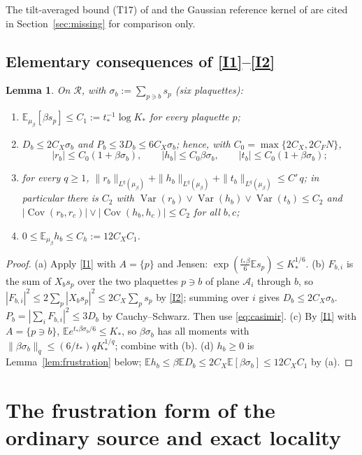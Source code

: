 \documentclass[11pt]{article}
\newtheorem{lemma}[theorem]{Lemma}
\theoremstyle{definition}
\newcommand{\E}{\mathbb{E}}
\newcommand{\Var}{\operatorname{Var}}
\newcommand{\Cov}{\operatorname{Cov}}
\begin{document}
The tilt-averaged bound (T17) of \cite[Part~VI]{csj} and the Gaussian reference kernel of
\cite[Part~III, (2.7)--(2.10)]{csj} are cited in Section~\ref{sec:missing} for comparison only.

\subsection{Elementary consequences of \ref{I1}--\ref{I2}}

\begin{lemma}\label{lem:moments}
On $\mathcal R$, with $\sigma_b:=\sum_{p\ni b}s_p$ (six plaquettes):
\begin{enumerate}
\item[(a)] $\E_{\mu_\beta}[\beta s_p]\le C_1:=t_*^{-1}\log K_*$ for every plaquette $p$;
\item[(b)] $D_b\le 2C_X\sigma_b$ and $P_b\le 3D_b\le 6C_X\sigma_b$; hence, with $C_0=\max\{2C_X,2C_FN\}$,
\[
|r_b|\le C_0(1+\beta\sigma_b),\qquad |h_b|\le C_0\beta\sigma_b,\qquad |t_b|\le C_0(1+\beta\sigma_b);
\]
\item[(c)] for every $q\ge1$, $\|r_b\|_{L^q(\mu_\beta)}+\|h_b\|_{L^q(\mu_\beta)}+\|t_b\|_{L^q(\mu_\beta)}\le C'\,q$;
in particular there is $C_2$ with $\Var(r_b)\vee\Var(h_b)\vee\Var(t_b)\le C_2$ and
$|\Cov(r_b,r_c)|\vee|\Cov(h_b,h_c)|\le C_2$ for all $b,c$;
\item[(d)] $0\le \E_{\mu_\beta}h_b\le C_h:=12C_XC_1$.
\end{enumerate}
\end{lemma}
\begin{proof}
(a) Apply \ref{I1} with $A=\{p\}$ and Jensen: $\exp(\tfrac{t_*\beta}{6}\E s_p)\le K_*^{1/6}$.
(b) $F_{b,i}$ is the sum of $X_bs_p$ over the two plaquettes $p\ni b$ of plane $\mathcal A_i$ through $b$, so
$|F_{b,i}|^2\le 2\sum_{p}|X_bs_p|^2\le2C_X\sum_ps_p$ by \ref{I2}; summing over $i$ gives $D_b\le2C_X\sigma_b$.
$P_b=|\sum_iF_{b,i}|^2\le3D_b$ by Cauchy--Schwarz. Then use \eqref{eq:casimir}.
(c) By \ref{I1} with $A=\{p\ni b\}$, $\E e^{t_*\beta\sigma_b/6}\le K_*$, so $\beta\sigma_b$ has all moments with
$\|\beta\sigma_b\|_q\le (6/t_*)qK_*^{1/q}$; combine with (b).
(d) $h_b\ge0$ is Lemma~\ref{lem:frustration} below; $\E h_b\le\beta\E D_b\le 2C_X\E[\beta\sigma_b]\le 12C_XC_1$ by (a).
\end{proof}

\section{The frustration form of the ordinary source and exact locality}\label{sec:frustration}
\end{document}
